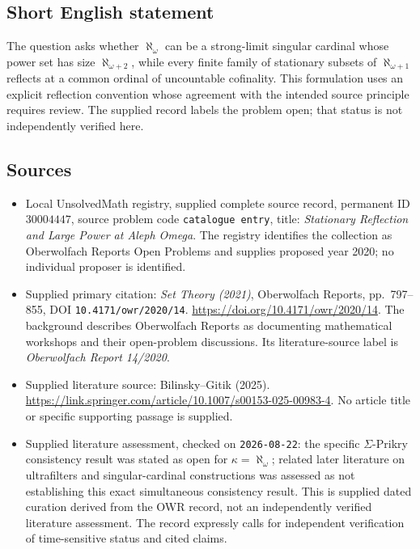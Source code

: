 \documentclass[11pt]{article}
\begin{document}
\subsection{Short English statement}
The question asks whether \(\aleph_\omega\) can be a strong-limit singular cardinal whose power set has size \(\aleph_{\omega+2}\), while every finite family of stationary subsets of \(\aleph_{\omega+1}\) reflects at a common ordinal of uncountable cofinality. This formulation uses an explicit reflection convention whose agreement with the intended source principle requires review. The supplied record labels the problem open; that status is not independently verified here.
\subsection{Sources}
\begin{itemize}
\item Local UnsolvedMath registry, supplied complete source record, permanent ID \(30004447\), source problem code \texttt{catalogue entry}, title: \emph{Stationary Reflection and Large Power at Aleph Omega}. The registry identifies the collection as Oberwolfach Reports Open Problems and supplies proposed year 2020; no individual proposer is identified.
\item Supplied primary citation: \emph{Set Theory (2021)}, Oberwolfach Reports, pp.\ 797--855, DOI \texttt{10.4171/owr/2020/14}. \url{https://doi.org/10.4171/owr/2020/14}. The background describes Oberwolfach Reports as documenting mathematical workshops and their open-problem discussions. Its literature-source label is \emph{Oberwolfach Report 14/2020}.
\item Supplied literature source: Bilinsky--Gitik (2025). \url{https://link.springer.com/article/10.1007/s00153-025-00983-4}. No article title or specific supporting passage is supplied.
\item Supplied literature assessment, checked on \texttt{2026-08-22}: the specific \(\Sigma\)-Prikry consistency result was stated as open for \(\kappa=\aleph_\omega\); related later literature on ultrafilters and singular-cardinal constructions was assessed as not establishing this exact simultaneous consistency result. This is supplied dated curation derived from the OWR record, not an independently verified literature assessment. The record expressly calls for independent verification of time-sensitive status and cited claims.
\end{itemize}
\end{document}
